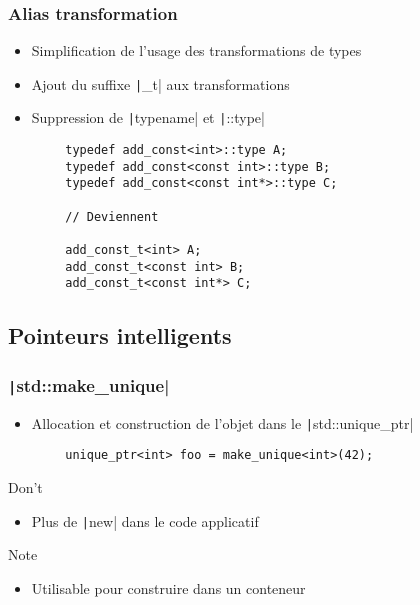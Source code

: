 \documentclass[C++.tex]{subfiles}
\begin{document}
\begin{frame}[fragile]
	\frametitle{Alias transformation}
	\begin{itemize}
		\item Simplification de l'usage des transformations de types
		\item Ajout du suffixe \texttt|_t| aux transformations
		\item Suppression de \texttt|typename| et \texttt|::type|
	\end{itemize}

	\begin{verbatim}
		typedef add_const<int>::type A;
		typedef add_const<const int>::type B;
		typedef add_const<const int*>::type C;

		// Deviennent

		add_const_t<int> A;
		add_const_t<const int> B;
		add_const_t<const int*> C;
	\end{verbatim}
\end{frame}

\subsection*{Pointeurs intelligents}
\begin{frame}[fragile]
	\frametitle{\texttt|std::make_unique|}
	\begin{itemize}
		\item Allocation et construction de l'objet dans le \texttt|std::unique_ptr|
	\end{itemize}

	\begin{verbatim}
		unique_ptr<int> foo = make_unique<int>(42);
	\end{verbatim}

	\begin{alertblock}{Don't}
		\begin{itemize}
			\item Plus de \texttt|new| dans le code applicatif
		\end{itemize}
	\end{alertblock}

	\begin{block}{Note}
		\begin{itemize}
			\item Utilisable pour construire dans un conteneur
		\end{itemize}
	\end{block}
\end{frame}
\end{document}
